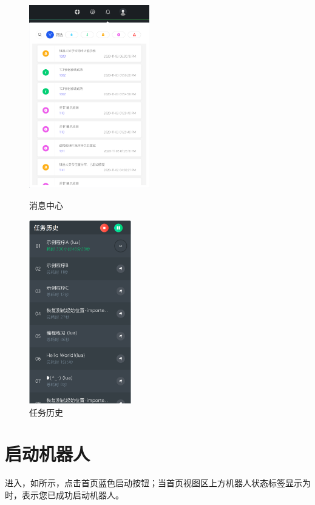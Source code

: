 \begin{figure}[htb]
	\centering
	\begin{minipage}[t]{0.55\linewidth}
		\centering
		\includegraphics[height=8cm]{screen/2-14.png}
		\caption{消息中心}
		\label{fig:消息中心}
	\end{minipage}
	\hfill
	\begin{minipage}[t]{0.4\linewidth}
		\centering
		\includegraphics[height=8cm]{screen/2-15.png}
		\caption{任务历史}
		\label{fig:任务历史}
	\end{minipage}
\end{figure}

\clearpage

\section{启动机器人}
进入\LM ，如所示，点击首页蓝色启动按钮；当首页视图区上方机器人状态标签显示为时，表示您已成功启动机器人。

